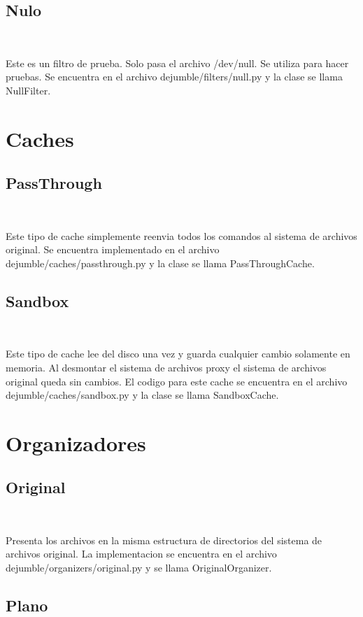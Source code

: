 \subsection{Nulo}
\label{nulo}

Este es un filtro de prueba. Solo pasa el archivo /dev/null. Se utiliza para hacer pruebas. Se encuentra en el archivo dejumble/filters/null.py y la clase se llama NullFilter.


\section{Caches}
\label{caches}

\subsection{PassThrough}
\label{passthrough}

Este tipo de cache simplemente reenvia todos los comandos al sistema de archivos original. Se encuentra implementado en el archivo dejumble/caches/passthrough.py y la clase se llama PassThroughCache.

\subsection{Sandbox}
\label{sandbox}

Este tipo de cache lee del disco una vez y guarda cualquier cambio solamente en memoria. Al desmontar el sistema de archivos proxy el sistema de archivos original queda sin cambios. El codigo para este cache se encuentra en el archivo dejumble/caches/sandbox.py y la clase se llama SandboxCache.


\section{Organizadores}
\label{organizadores}

\subsection{Original}
\label{original}

Presenta los archivos en la misma estructura de directorios del sistema de archivos original. La implementacion se encuentra en el archivo dejumble/organizers/original.py y se llama OriginalOrganizer.

\subsection{Plano}
\label{plano}

